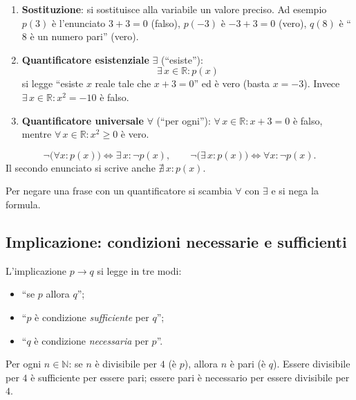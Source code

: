 \documentclass[11pt,a4paper]{article}
\begin{document}
\begin{enumerate}
    \item \textbf{Sostituzione}: si sostituisce alla variabile un valore
          preciso. Ad esempio $p(3)$ è l'enunciato $3 + 3 = 0$ (falso),
          $p(-3)$ è $-3 + 3 = 0$ (vero), $q(8)$ è ``$8$ è un numero pari''
          (vero).

    \item \textbf{Quantificatore esistenziale} $\exists$ (``esiste''):
          \[
          \exists\, x \in \mathbb{R} : p(x)
          \]
          si legge ``esiste $x$ reale tale che $x + 3 = 0$'' ed è vero
          (basta $x = -3$). Invece
          $\exists\, x \in \mathbb{R} : x^2 = -10$ è falso.

    \item \textbf{Quantificatore universale} $\forall$ (``per ogni''):
          $\forall\, x \in \mathbb{R} : x + 3 = 0$ è falso, mentre
          $\forall\, x \in \mathbb{R} : x^2 \geq 0$ è vero.
\end{enumerate}

\begin{proposizione}
\[
\neg\big(\forall x : p(x)\big) \iff \exists\, x : \neg p(x), \qquad
\neg\big(\exists\, x : p(x)\big) \iff \forall x : \neg p(x).
\]
Il secondo enunciato si scrive anche $\nexists\, x : p(x)$.
\end{proposizione}

Per negare una frase con un quantificatore si scambia $\forall$ con
$\exists$ e si nega la formula.

\subsection{Implicazione: condizioni necessarie e sufficienti}

L'implicazione $p \to q$ si legge in tre modi:
\begin{itemize}
    \item ``se $p$ allora $q$'';
    \item ``$p$ è condizione \emph{sufficiente} per $q$'';
    \item ``$q$ è condizione \emph{necessaria} per $p$''.
\end{itemize}

\begin{esempio}
Per ogni $n \in \mathbb{N}$: se $n$ è divisibile per $4$ (è $p$), allora
$n$ è pari (è $q$). Essere divisibile per $4$ è sufficiente per essere
pari; essere pari è necessario per essere divisibile per $4$.
\end{esempio}
\end{document}
